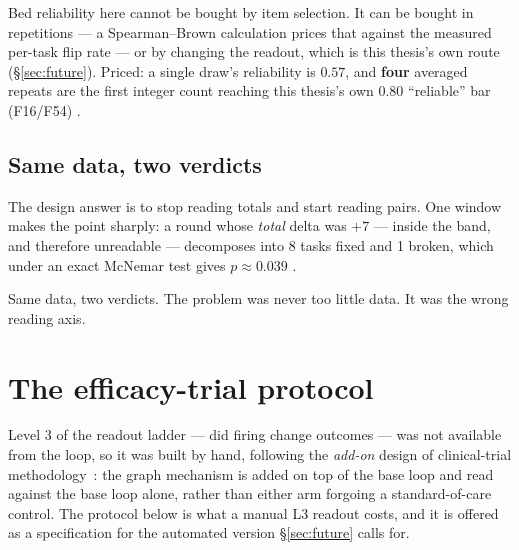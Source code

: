 Bed reliability here cannot be bought by item selection. It can be bought
in repetitions --- a Spearman--Brown calculation prices that against the
measured per-task flip rate --- or by changing the readout, which is this
thesis's own route (\S\ref{sec:future}). Priced: a single draw's
reliability is $0.57$, and \textbf{four} averaged repeats are the first
integer count reaching this thesis's own $0.80$ ``reliable'' bar
(F16/F54) .

\subsection*{Same data, two verdicts}

The design answer is to stop reading totals and start reading pairs. One
window makes the point sharply: a round whose \emph{total} delta was $+7$
--- inside the band, and therefore unreadable --- decomposes into 8 tasks
fixed and 1 broken, which under an exact McNemar test gives $p \approx
0.039$ .

Same data, two verdicts. The problem was never too little data. It was the
wrong reading axis.

\section{The efficacy-trial protocol}
\label{sec:efficacy-protocol}

Level 3 of the readout ladder --- did firing change outcomes --- was not
available from the loop, so it was built by hand, following the
\emph{add-on} design of clinical-trial methodology~\cite{ich-e10}: the
graph mechanism is added on top of the base loop and read against the
base loop alone, rather than either arm forgoing a standard-of-care
control. The protocol below is
what a manual L3 readout costs, and it is offered as a specification for
the automated version \S\ref{sec:future} calls for.

